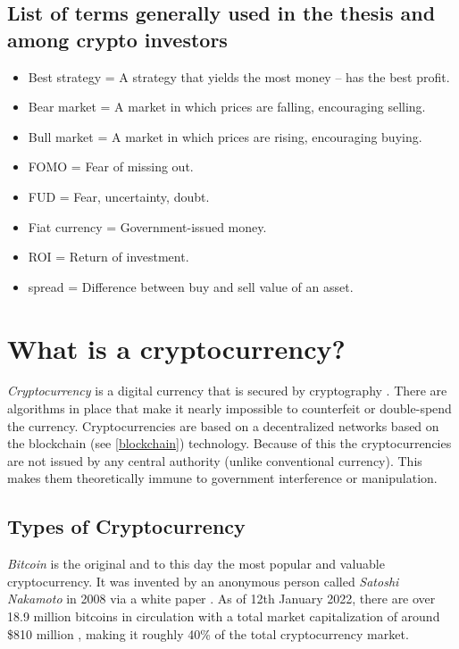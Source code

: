 \subsection*{List of terms generally used in the thesis and among crypto investors}
\begin{itemize}
    \item Best strategy = A strategy that yields the most money -- has the best profit.
    \item Bear market = A market in which prices are falling, encouraging selling.
    \item Bull market = A market in which prices are rising, encouraging buying.
    \item FOMO = Fear of missing out.
    \item FUD = Fear, uncertainty, doubt.
    \item Fiat currency = Government-issued money.
    \item ROI = Return of investment.
    \item spread = Difference between buy and sell value of an asset.
\end{itemize}

\section{What is a cryptocurrency?}
\emph{Cryptocurrency} is a digital currency that is secured by cryptography \cite{investopedia-cryptocurrency}. There are algorithms in place that make it nearly impossible to counterfeit or double-spend the currency. Cryptocurrencies are based on a decentralized networks based on the blockchain (see \ref{blockchain}) technology. Because of this the cryptocurrencies are not issued by any central authority (unlike conventional currency). This makes them theoretically immune to government interference or manipulation.

\subsection*{Types of Cryptocurrency}
\emph{Bitcoin} is the original and to this day the most popular and valuable cryptocurrency. It was invented by an anonymous person called \emph{Satoshi Nakamoto} in 2008 via a white paper \cite{satoshi}. As of 12th January 2022, there are over 18.9 million bitcoins in circulation with a total market capitalization of around \$810 million \cite{coinmarketcap}, making it roughly 40\% of the total cryptocurrency market.


